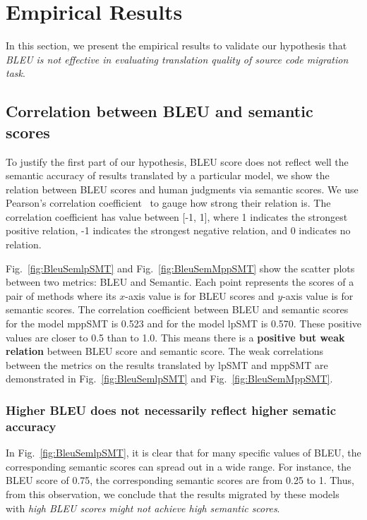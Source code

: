 \section{Empirical Results}
\label{sec:bleuresult}

In this section, we present the empirical results to validate our hypothesis that
\textit{BLEU is not effective in evaluating translation quality of source code migration task}.
\subsection{Correlation between BLEU and semantic scores}
To justify the first part of our hypothesis, BLEU score does not reflect well
the semantic accuracy of results translated by a particular model,
we show the relation between BLEU scores and human judgments via semantic scores.
We use Pearson's correlation coefficient~\cite{PearsonCorrelation} to gauge
how strong their relation is. The correlation coefficient has value
between [-1, 1], where 1 indicates the strongest positive relation, -1
indicates the strongest negative relation, and 0 indicates no relation.

Fig.~\ref{fig:BleuSemlpSMT} and Fig.~\ref{fig:BleuSemMppSMT} show the
scatter plots between two metrics: BLEU and Semantic. Each point
represents the scores of a pair of methods where its $x$-axis value is
for BLEU scores and $y$-axis value is for semantic scores. The
correlation coefficient between BLEU and semantic scores for the model
mppSMT is 0.523 and for the model lpSMT is 0.570. These positive values
are closer to 0.5 than to 1.0. This means there is a {\bf positive but weak
relation} between BLEU score and semantic score. The weak correlations %
between the metrics on the results translated by lpSMT and mppSMT are
demonstrated in Fig.~\ref{fig:BleuSemlpSMT} and Fig.~\ref{fig:BleuSemMppSMT}.


\subsubsection{{\bf Higher BLEU does not necessarily reflect higher
sematic accuracy}}

In Fig.~\ref{fig:BleuSemlpSMT}, it is clear that for many specific
values of BLEU, the corresponding semantic scores can spread out in a
wide range. For instance, the BLEU score of 0.75, the corresponding
semantic scores are from 0.25 to 1.
Thus, from this observation, we conclude that the results migrated by
these models with {\em high BLEU scores might not achieve high semantic
scores}.
%

